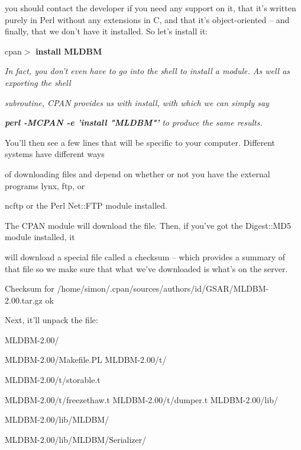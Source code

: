 \documentclass[a4paper,11pt]{book}
\begin{document}
\noindent you should contact the developer if you need any support on it, that it's written purely in Perl without any extensions in C, and that it's object-oriented -- and finally, that we don't have it installed. So let's install it:

\noindent 

\noindent cpan$>$ \textbf{install MLDBM}

\noindent 

\noindent \textit{In fact, you don't even have to go into the shell to install a module. As well as exporting the shell}

\noindent \textit{subroutine, CPAN provides us with install, with which we can simply say}

\noindent \textbf{\textit{perl -MCPAN -e 'install "MLDBM"' }}\textit{to produce the same results.}

\noindent 

\noindent 

\noindent You'll then see a few lines that will be specific to your computer. Different systems have different ways

\noindent of downloading files and depend on whether or not you have the external programs lynx, ftp, or

\noindent ncftp or the Perl Net::FTP module installed.

\noindent 

\noindent The CPAN module will download the file. Then, if you've got the Digest::MD5 module installed, it

\noindent will download a special file called a checksum -- which provides a summary of that file so we make sure that what we've downloaded is what's on the server.

\noindent 

\noindent Checksum for /home/simon/.cpan/sources/authors/id/GSAR/MLDBM-2.00.tar.gz ok

\noindent 

\noindent Next, it'll unpack the file:

\noindent 

\noindent MLDBM-2.00/

\noindent MLDBM-2.00/Makefile.PL MLDBM-2.00/t/

\noindent MLDBM-2.00/t/storable.t

\noindent MLDBM-2.00/t/freezethaw.t MLDBM-2.00/t/dumper.t MLDBM-2.00/lib/

\noindent MLDBM-2.00/lib/MLDBM/

\noindent MLDBM-2.00/lib/MLDBM/Serializer/
\end{document}
